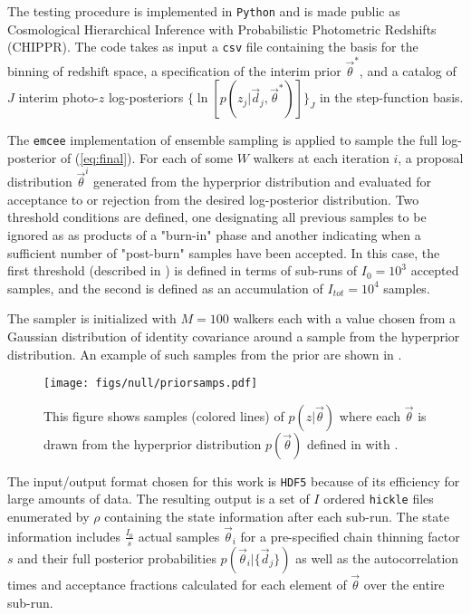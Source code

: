 The testing procedure is implemented in \texttt{Python} and is made public as Cosmological Hierarchical Inference with Probabilistic Photometric Redshifts (CHIPPR).  
The code takes as input a \texttt{csv} file containing the basis for the binning of redshift space, a specification of the interim prior $\vec{\theta}^{*}$, and a catalog of $J$ interim photo-$z$ log-posteriors $\{\ln[p(z_{j}|\vec{d}_{j},\vec{\theta}^{*})]\}_{J}$ in the step-function basis.

The \texttt{emcee} \citep{Foreman-Mackey2013} implementation of ensemble sampling is applied to sample the full log-posterior of (\ref{eq:final}).   
For each of some $W$ walkers at each iteration $i$, a proposal distribution $\vec{\theta}^{i}$ generated from the hyperprior distribution and evaluated for acceptance to or rejection from the desired log-posterior distribution.  
Two threshold conditions are defined, one designating all previous samples to be ignored as as products of a "burn-in" phase and another indicating when a sufficient number of "post-burn" samples have been accepted.  
In this case, the first threshold (described in ) is defined in terms of sub-runs of $I_{0}=10^{3}$ accepted samples, and the second is defined as an accumulation of $I_{tot}=10^{4}$ samples.

The sampler is initialized with $M=100$ walkers each with a value chosen from a Gaussian distribution of identity covariance around a sample from the hyperprior distribution.  
An example of such samples from the prior are shown in .

\begin{figure}
	\texttt{[image: figs/null/priorsamps.pdf]}
	\caption{This figure shows samples (colored lines) of $p(z|\vec{\theta})$ where each $\vec{\theta}$ is drawn from the hyperprior distribution $p(\vec{\theta})$ defined in  with .}
	\label{fig:prior}
\end{figure}

The input/output format chosen for this work is \texttt{HDF5} because of its efficiency for large amounts of data.  
The resulting output is a set of $I$ ordered \texttt{hickle} files enumerated by $\rho$ containing the state information after each sub-run.  
The state information includes $\frac{I_{0}}{s}$ actual samples $\vec{\theta}_{i}$ for a pre-specified chain thinning factor $s$ and their full posterior probabilities $p(\vec{\theta}_{i}|\{\vec{d}_{j}\})$ as well as the autocorrelation times and acceptance fractions calculated for each element of $\vec{\theta}$ over the entire sub-run.  

